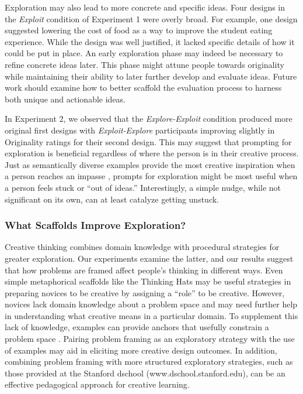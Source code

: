 Exploration may also lead to more concrete and specific ideas. Four designs in the \textit{Exploit} condition of Experiment 1 were overly broad. For example, one design suggested lowering the cost of food as a way to improve the student eating experience. While the design was well justified, it lacked specific details of how it could be put in place. An early exploration phase may indeed be necessary to refine concrete ideas later. This phase might attune people towards originality while maintaining their ability to later further develop and evaluate ideas. Future work should examine how to better scaffold the evaluation process to harness both unique and actionable ideas.

In Experiment 2, we observed that the \textit{Explore-Exploit} condition produced more original first designs with \textit{Exploit-Explore} participants improving slightly in Originality ratings for their second design. This may suggest that prompting for exploration is beneficial regardless of where the person is in their creative process. Just as semantically diverse examples provide the most creative inspiration when a person reaches an impasse \cite{chan2017semantically}, prompts for exploration might be most useful when a person feels stuck or ``out of ideas.'' Interestingly, a simple nudge, while not significant on its own, can at least catalyze getting unstuck.

\subsubsection{What Scaffolds Improve Exploration?}
Creative thinking combines domain knowledge with procedural strategies for greater exploration. Our experiments examine the latter, and our results suggest that how problems are framed affect people's thinking in different ways. Even simple metaphorical scaffolds like the Thinking Hats may be useful strategies in preparing novices to be creative by assigning a ``role'' to be creative. However, novices lack domain knowledge about a problem space and may need further help in understanding what creative means in a particular domain. To supplement this lack of knowledge, examples can provide anchors that usefully constrain a problem space \cite{Dow2009, kulkarni2012early}. Pairing problem framing as an exploratory strategy with the use of examples may aid in eliciting more creative design outcomes. In addition, combining problem framing with more structured exploratory strategies, such as those provided at the Stanford dschool (www.dschool.stanford.edu), can be an effective pedagogical approach for creative learning. 


